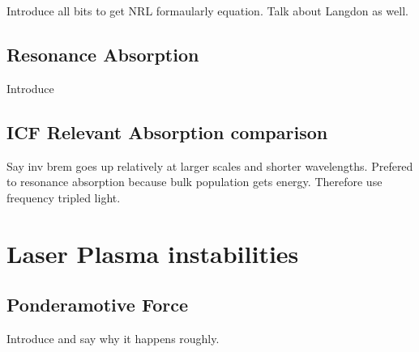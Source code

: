 Introduce all bits to get NRL formaularly equation.
Talk about Langdon as well.

\subsection{Resonance Absorption}%
\label{sec:theory_res_abs}

Introduce

\subsection{ICF Relevant Absorption comparison}%
\label{sec:theory_absorption_comparison}

Say inv brem goes up relatively at larger scales and shorter wavelengths.
Prefered to resonance absorption because bulk population gets energy.
Therefore use frequency tripled light.


\section{Laser Plasma instabilities}%
\label{sec:theory_LPIs}

\subsection{Ponderamotive Force}%
\label{sec:theory_ponderamotive}

Introduce and say why it happens roughly.

